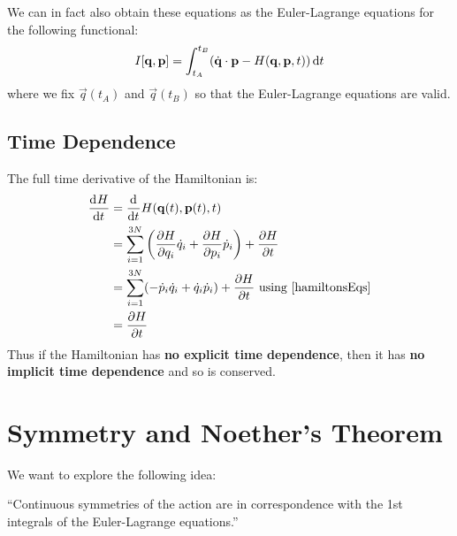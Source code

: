 \documentclass[../main.tex]{subfiles}
\begin{document}
We can in fact also obtain these equations as the Euler-Lagrange equations for the following functional:
\[
  I[\vec{q}, \vec{p}] = \int_{t_A}^{t_B} (\dot{\vec{q}} \cdot \vec{p} - H(\vec{q}, \vec{p}, t)) \d{t}
\]
where we fix $\vec{q}(t_A)$ and $\vec{q}(t_B)$ so that the Euler-Lagrange equations are valid.
\subsection{Time Dependence}
The full time derivative of the Hamiltonian is:
\begin{align*}
  \deriv{H}{t} &= \deriv{}{t}H(\vec{q}(t), \vec{p}(t), t) \\
               &= \sum_{i = 1}^{3N} \left(\pderiv{H}{q_i}\dot{q}_i + \pderiv{H}{p_i}\dot{p}_i\right) + \pderiv{H}{t} \\
               &= \sum_{i = 1}^{3N} (-\dot{p}_i \dot{q}_i + \dot{q}_i \dot{p}_i) + \pderiv{H}{t} \text{ using \cref{hamiltonsEqs}} \\
               &= \pderiv{H}{t}
\end{align*}
Thus if the Hamiltonian has \textbf{no explicit time dependence}, then it has \textbf{no implicit time dependence} and so is conserved.
\section{Symmetry and Noether's Theorem}
We want to explore the following idea:
\begin{center}
  ``Continuous symmetries of the action are in correspondence with the 1st integrals of the Euler-Lagrange equations.''
\end{center}
\end{document}
